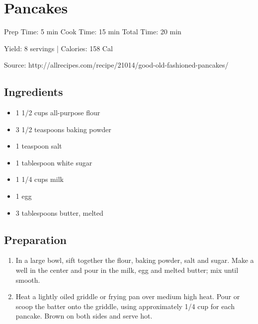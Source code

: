 \section{Pancakes}

\begin{center}
Prep Time: 5 min
Cook Time: 15 min
Total Time: 20 min

\noindent Yield: 8 servings | Calories: 158 Cal

\vspace{1em}

  Source: http://allrecipes.com/recipe/21014/good-old-fashioned-pancakes/
\end{center}

\subsection{Ingredients}
\begin{multicols}{2}
\begin{itemize}
  \item 1 1/2 cups all-purpose flour
  \item 3 1/2 teaspoons baking powder
  \item 1 teaspoon salt
  \item 1 tablespoon white sugar
  \item 1 1/4 cups milk
  \item 1 egg
  \item 3 tablespoons butter, melted
\end{itemize}
\end{multicols}

\subsection{Preparation}
\begin{enumerate}
  \item In a large bowl, sift together the flour, baking powder, salt and sugar. Make a well in the center and pour in the milk, egg and melted butter; mix until smooth.
  \item Heat a lightly oiled griddle or frying pan over medium high heat. Pour or scoop the batter onto the griddle, using approximately 1/4 cup for each pancake. Brown on both sides and serve hot.
\end{enumerate}